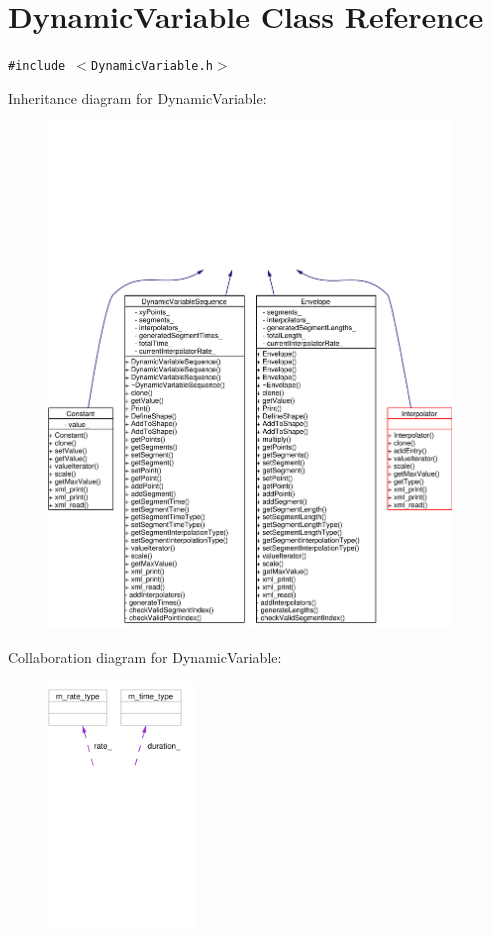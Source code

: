\hypertarget{classDynamicVariable}{
\section{Dynamic\-Variable Class Reference}
\label{classDynamicVariable}
}
{\tt \#include $<$Dynamic\-Variable.h$>$}

Inheritance diagram for Dynamic\-Variable:\begin{figure}[H]
\begin{center}
\leavevmode
\includegraphics[width=303pt]{classDynamicVariable__inherit__graph}
\end{center}
\end{figure}
Collaboration diagram for Dynamic\-Variable:\begin{figure}[H]
\begin{center}
\leavevmode
\includegraphics[width=112pt]{classDynamicVariable__coll__graph}
\end{center}
\end{figure}
